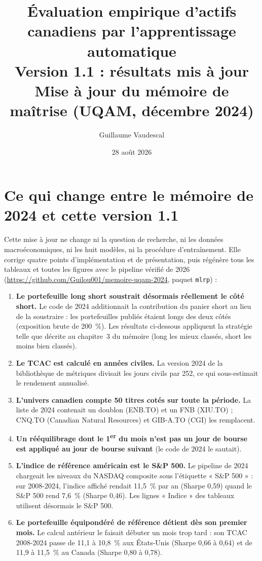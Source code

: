 \documentclass[11pt]{article}
\title{Évaluation empirique d'actifs canadiens par l'apprentissage automatique\\
\large Version 1.1 : résultats mis à jour\\
\normalsize Mise à jour du mémoire de maîtrise (UQAM, décembre 2024)}
\author{Guillaume Vaudescal}
\date{28 août 2026}
\begin{document}
\maketitle

\section*{Ce qui change entre le mémoire de 2024 et cette version 1.1}

Cette mise à jour ne change ni la question de recherche, ni les données macroéconomiques, ni les huit modèles,
ni la procédure d'entraînement. Elle corrige quatre points d'implémentation et de présentation, puis régénère
tous les tableaux et toutes les figures avec le pipeline vérifié de 2026
(\url{https://github.com/Guilou001/memoire-uqam-2024}, paquet \texttt{mlrp}) :

\begin{enumerate}
  \item \textbf{Le portefeuille long short soustrait désormais réellement le côté short.} Le code de 2024
  additionnait la contribution du panier short au lieu de la soustraire : les portefeuilles publiés étaient
  longs des deux côtés (exposition brute de 200~\%). Les résultats ci-dessous appliquent la stratégie telle que
  décrite au chapitre~3 du mémoire (long les mieux classés, short les moins bien classés).
  \item \textbf{Le TCAC est calculé en années civiles.} La version 2024 de la bibliothèque de métriques divisait
  les jours civils par 252, ce qui sous-estimait le rendement annualisé.
  \item \textbf{L'univers canadien compte 50 titres cotés sur toute la période.} La liste de 2024 contenait un
  doublon (ENB.TO) et un FNB (XIU.TO) ; CNQ.TO (Canadian Natural Resources) et GIB-A.TO (CGI) les remplacent.
  \item \textbf{Un rééquilibrage dont le 1\textsuperscript{er} du mois n'est pas un jour de bourse est appliqué
  au jour de bourse suivant} (le code de 2024 le sautait).
  \item \textbf{L'indice de référence américain est le S\&P 500.} Le pipeline de 2024 chargeait les niveaux du
  NASDAQ composite sous l'étiquette « S\&P 500 » : sur 2008-2024, l'indice affiché rendait 11,5~\% par an
  (Sharpe 0,59) quand le S\&P 500 rend 7,6~\% (Sharpe 0,46). Les lignes « Indice » des tableaux utilisent
  désormais le S\&P 500.
  \item \textbf{Le portefeuille équipondéré de référence détient dès son premier mois.} Le calcul antérieur le
  faisait débuter un mois trop tard : son TCAC 2008-2024 passe de 11,1 à 10,8~\% aux États-Unis (Sharpe 0,66 à
  0,64) et de 11,9 à 11,5~\% au Canada (Sharpe 0,80 à 0,78).
\end{enumerate}
\end{document}
